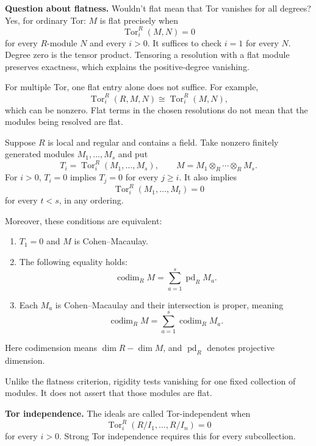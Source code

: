 \medskip\noindent
\textbf{Question about flatness.}
Wouldn't flat mean that Tor vanishes for
all degrees? Yes, for ordinary Tor:
$M$ is flat precisely when
$$
\operatorname{Tor}_i^R(M,N)=0
$$
for every $R$-module $N$ and every $i>0$.
It suffices to check $i=1$ for every $N$.
Degree zero is the tensor product.
Tensoring a resolution with a flat module
preserves exactness, which explains the
positive-degree vanishing.

For multiple Tor, one flat entry alone
does not suffice. For example,
$$
\operatorname{Tor}_i^R(R,M,N)
\cong\operatorname{Tor}_i^R(M,N),
$$
which can be nonzero. Flat terms in the
chosen resolutions do not mean that
the modules being resolved are flat.

\begin{theorem}
\label{theorem-rafael-rigidity}
Suppose $R$ is local and regular and
contains a field. Take nonzero finitely
generated modules $M_1,\ldots,M_s$ and put
$$
T_i=\operatorname{Tor}_i^R
(M_1,\ldots,M_s),\qquad
M=M_1\otimes_R\cdots\otimes_R M_s.
$$
For $i>0$, $T_i=0$ implies $T_j=0$ for
every $j\geq i$. It also implies
$$
\operatorname{Tor}_i^R
(M_1,\ldots,M_t)=0
$$
for every $t<s$, in any ordering.

Moreover, these conditions are equivalent:
\begin{enumerate}
\item $T_1=0$ and $M$ is Cohen--Macaulay.
\item The following equality holds:
$$
\operatorname{codim}_R M
=\sum_{a=1}^s\operatorname{pd}_R M_a.
$$
\item Each $M_a$ is Cohen--Macaulay and
their intersection is proper, meaning
$$
\operatorname{codim}_R M
=\sum_{a=1}^s\operatorname{codim}_R M_a.
$$
\end{enumerate}
Here codimension means $\dim R-\dim M$,
and $\operatorname{pd}_R$ denotes
projective dimension.
\end{theorem}

Unlike the flatness criterion, rigidity
tests vanishing for one fixed collection
of modules. It does not assert that
those modules are flat.

\medskip\noindent
\textbf{Tor independence.}
The ideals are called Tor-independent
when
$$
\operatorname{Tor}_i^R
(R/I_1,\ldots,R/I_n)=0
$$
for every $i>0$. Strong Tor independence
requires this for every subcollection.

